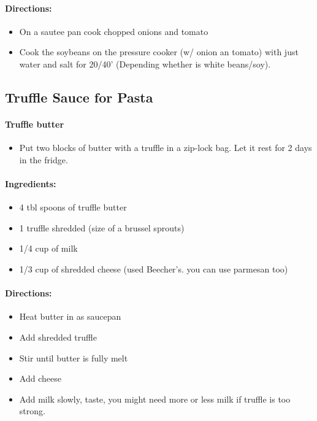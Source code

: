 \documentclass{article}
\begin{document}
\paragraph{Directions:}
\begin{itemize}
	\item On a sautee pan cook chopped onions and tomato
	\item Cook the soybeans on the pressure cooker (w/ onion an tomato) with just water and salt for 20/40' (Depending whether is white beans/soy).
\end{itemize}

\subsection{Truffle Sauce for Pasta}

\paragraph{Truffle butter}
\begin{itemize}
	\item Put two blocks of butter with a truffle in a zip-lock bag. Let it rest for 2 days in the fridge.
\end{itemize}

\paragraph{Ingredients:}

\begin{itemize}
	\item 4 tbl spoons of truffle butter
	\item 1 truffle shredded (size of a brussel sprouts)
	\item 1/4 cup of milk
	\item 1/3 cup of shredded cheese (used Beecher's. you can use parmesan too)
\end{itemize}

\paragraph{Directions:}
\begin{itemize}
	\item Heat butter in as saucepan
	\item Add shredded truffle
	\item Stir until butter is fully melt
	\item Add cheese
	\item Add milk slowly, taste, you might need more or less milk if truffle is too strong.
\end{itemize}
\end{document}
